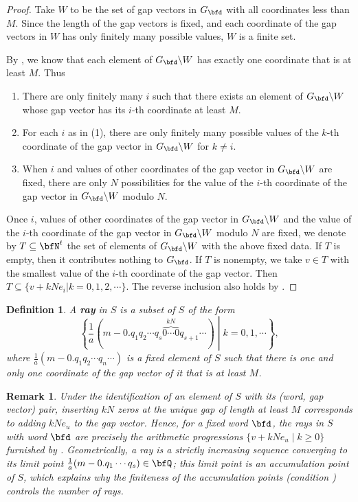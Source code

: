 \documentclass[english,oneside]{smfart}
\newtheorem{remark}[theorem]{Remark}
\newtheorem{definition}[theorem]{Definition}
\begin{document}
\begin{proof}
    Take $W$ to be the set of gap vectors in $G_{\bfd}$ with all coordinates less than $M$. Since the length of the gap vectors is fixed, and each coordinate of the gap vectors in $W$ has only finitely many possible values, $W$ is a finite set.

    By , we know that each element of $G_{\bfd}\backslash W$ has exactly one coordinate that is at least $M$. Thus
    \begin{enumerate}
        \item There are only finitely many $i$ such that there exists an element of $G_{\bfd}\backslash W$ whose gap vector has its $i$-th coordinate at least $M$.
        \item For each $i$ as in (1), there are only finitely many possible values of the $k$-th coordinate of the gap vector in $G_{\bfd}\backslash W$ for $k\neq i$.
        \item When $i$ and values of other coordinates of the gap vector in $G_{\bfd}\backslash W$ are fixed, there are only $N$ possibilities for the value of the $i$-th coordinate of the gap vector in $G_{\bfd}\backslash W$ modulo $N$.
    \end{enumerate}
    Once $i$, values of other coordinates of the gap vector in $G_{\bfd}\backslash W$ and the value of the $i$-th coordinate of the gap vector in $G_{\bfd}\backslash W$ modulo $N$ are fixed, we denote by $T\subseteq \bfN^t$ the set of elements of $G_{\bfd}\backslash W$ with the above fixed data. If $T$ is empty, then it contributes nothing to $G_{\bfd}$. If $T$ is nonempty, we take $v\in T$ with the smallest value of the $i$-th coordinate of the gap vector. Then $T\subseteq \{v+kNe_i|k=0,1,2,\cdots\}$. The reverse inclusion also holds by .
\end{proof}
\begin{definition}\label{def:33761}
    A \textbf{ray} in $S$ is a subset of $S$ of the form
    $$\left\{\frac{1}{a}\left(m-0.q_1q_2\cdots q_{s}\overbrace{0\cdots 0}^{kN}q_{s+1}\cdots\right)\middle\vert k=0,1,\cdots\right\},$$
    where $\frac{1}{a}(m-0.q_1q_2\cdots q_n\cdots)$ is a fixed element of $S$ such that there is one and only one coordinate of the gap vector of it that is at least $M$.
\end{definition}
\begin{remark}\label{rem:ray-progression}
    Under the identification of an element of $S$ with its (word, gap vector) pair, inserting $kN$ zeros at the unique gap of length at least $M$ corresponds to adding $kNe_u$ to the gap vector. Hence, for a fixed word $\bfd$, the rays in $S$ with word $\bfd$ are precisely the arithmetic progressions $\{v+kNe_u\mid k\geq 0\}$ furnished by . Geometrically, a ray is a strictly increasing sequence converging to its limit point $\frac{1}{a}(m-0.q_1\cdots q_{s})\in\bfQ$; this limit point is an accumulation point of $S$, which explains why the finiteness of the accumulation points (condition ) controls the number of rays.
\end{remark}
\end{document}
